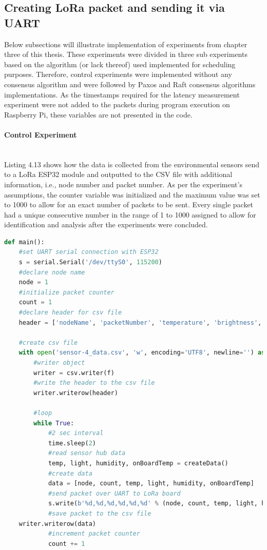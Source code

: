 \documentclass[oneside,12pt]{book}
\newcommand{\myparagraph}[1]{\paragraph{#1}\mbox{}\\}
\begin{document}
\subsection{Creating LoRa packet and sending it via UART}
Below subsections will illustrate implementation of experiments from chapter three of this thesis. These experiments were divided in three sub experiments based on the algorithm (or lack thereof) used implemented for scheduling purposes. Therefore, control experiments were implemented without any consensus algorithm and were followed by Paxos and Raft consensus algorithms implementations. As the timestamps required for the latency measurement experiment were not added to the packets during program execution on Raspberry Pi, these variables are not presented in the code.  
\myparagraph{Control Experiment}
Listing 4.13 shows how the data is collected from the environmental sensors send to a LoRa ESP32 module and outputted to the CSV file with additional information, i.e., node number and packet number. As per the experiment’s assumptions, the counter variable was initialized and the maximum value was set to 1000 to allow for an exact number of packets to be sent. Every single packet had a unique consecutive number in the range of 1 to 1000 assigned to allow for identification and analysis after the experiments were concluded.
\begin{lstlisting}[language=Python, caption=Control experiment Raspberry Pi code - Python3,captionpos=b ]
def main():
    #set UART serial connection with ESP32
    s = serial.Serial('/dev/ttyS0', 115200)
    #declare node name
    node = 1
    #initialize packet counter
    count = 1
    #declare header for csv file
    header = ['nodeName', 'packetNumber', 'temperature', 'brightness', 'humidity', 'onBoardTemp']  
   
    #create csv file
    with open('sensor-4_data.csv', 'w', encoding='UTF8', newline='') as f:
        #writer object
        writer = csv.writer(f)
        #write the header to the csv file
        writer.writerow(header)

        #loop 
        while True:
            #2 sec interval
            time.sleep(2)        
            #read sensor hub data
            temp, light, humidity, onBoardTemp = createData()
            #create data 
            data = [node, count, temp, light, humidity, onBoardTemp]
            #send packet over UART to LoRa board
            s.write(b'%d,%d,%d,%d,%d,%d' % (node, count, temp, light, humidity, onBoardTemp))
            #save packet to the csv file
	writer.writerow(data)			
            #increment packet counter
            count += 1
\end{lstlisting}
\end{document}
